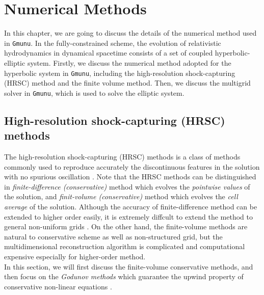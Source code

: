 
\chapter{Numerical Methods}  %

\ifpdf
    \graphicspath{{Chapter3/Figs/PDF/}{Chapter3/Figs/}}
\else
    \graphicspath{{Chapter3/Figs/}}
\fi

In this chapter, we are going to discuss the details of the numerical method used in \texttt{Gmunu}.
In the fully-constrained scheme, the evolution of relativistic hydrodynamics in dynamical spacetime
consists of a set of coupled hyperbolic-elliptic system.
Firstly, we discuss the numerical method adopted for the hyperbolic system in \texttt{Gmunu},
including the high-resolution shock-capturing (HRSC) method and the finite volume method.
Then, we discuss the multigrid solver in \texttt{Gmunu},
which is used to solve the elliptic system.

\section{High-resolution shock-capturing (HRSC) methods}
The high-resolution shock-capturing (HRSC) methods is a class of methods commonly used to
reproduce accurately the discontinuous features in the solution
with no spurious oscillation \cite{harten1997high}.
Note that the HRSC methods can be distinguished in \textit{finite-difference (conservative)} method
which evolves the \textit{pointwise values} of the solution,
and \textit{finit-volume (conservative)} method which evolves the \textit{cell average} of the solution.
Although the accuracy of finite-difference method can be extended to higher order easily,
it is extremely diffcult to extend the method to general non-uniform grids \cite{merriman2003understanding}.
On the other hand,
the finite-volume methods are natural to conservative scheme as well as non-structured grid,
but the multidimensional reconstruction algorithm is complicated and computational expensive especially for higher-order method.\\
In this section,
we will first discuss the finite-volume conservative methods,
and then focus on the \textit{Godunov methods} which guarantee the upwind property of conservative non-linear equations \cite{van1999introduction}.

